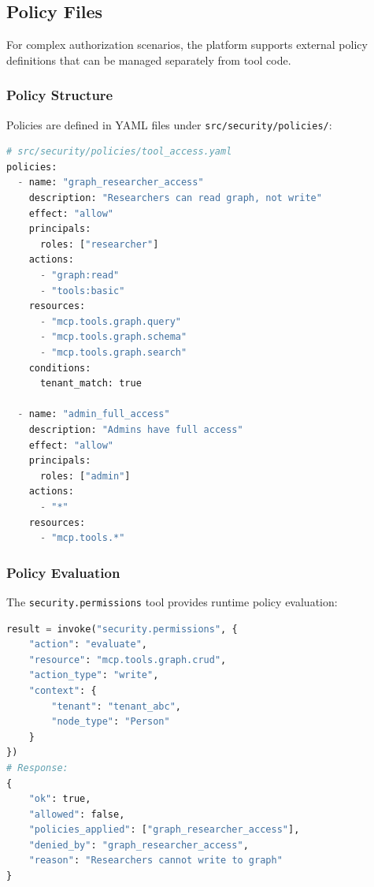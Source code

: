 \subsection{Policy Files}
\label{subsec:policy-files}

For complex authorization scenarios, the platform supports external policy definitions that can be managed separately from tool code.

\subsubsection{Policy Structure}

Policies are defined in YAML files under \texttt{src/security/policies/}:

\begin{lstlisting}[language=Python, caption={Example policy definition}, label={lst:policy-definition}]
# src/security/policies/tool_access.yaml
policies:
  - name: "graph_researcher_access"
    description: "Researchers can read graph, not write"
    effect: "allow"
    principals:
      roles: ["researcher"]
    actions:
      - "graph:read"
      - "tools:basic"
    resources:
      - "mcp.tools.graph.query"
      - "mcp.tools.graph.schema"
      - "mcp.tools.graph.search"
    conditions:
      tenant_match: true
  
  - name: "admin_full_access"
    description: "Admins have full access"
    effect: "allow"
    principals:
      roles: ["admin"]
    actions:
      - "*"
    resources:
      - "mcp.tools.*"
\end{lstlisting}

\subsubsection{Policy Evaluation}

The \texttt{security.permissions} tool provides runtime policy evaluation:

\begin{lstlisting}[language=Python, caption={Policy evaluation via security.permissions tool}, label={lst:policy-evaluation}]
result = invoke("security.permissions", {
    "action": "evaluate",
    "resource": "mcp.tools.graph.crud",
    "action_type": "write",
    "context": {
        "tenant": "tenant_abc",
        "node_type": "Person"
    }
})
# Response:
{
    "ok": true,
    "allowed": false,
    "policies_applied": ["graph_researcher_access"],
    "denied_by": "graph_researcher_access",
    "reason": "Researchers cannot write to graph"
}
\end{lstlisting}

